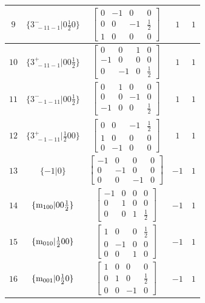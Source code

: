 \documentclass[fleqn,8pt]{jsarticle}
\begin{document}
\begin{longtable}{ccccc}
$ 9 $ & $ \{3^{-}_{\,\,-11-1}|0 \frac{1}{2} 0\} $ & $ \begin{bmatrix} 0 & -1 & 0 & 0 \\ 0 & 0 & -1 & \frac{1}{2} \\ 1 & 0 & 0 & 0 \end{bmatrix} $ & $ 1 $ & $ 1 $ \\ \hline
$ 10 $ & $ \{3^{+}_{\,\,-11-1}|0 0 \frac{1}{2}\} $ & $ \begin{bmatrix} 0 & 0 & 1 & 0 \\ -1 & 0 & 0 & 0 \\ 0 & -1 & 0 & \frac{1}{2} \end{bmatrix} $ & $ 1 $ & $ 1 $ \\ \hline
$ 11 $ & $ \{3^{-}_{\,\,-1-11}|0 0 \frac{1}{2}\} $ & $ \begin{bmatrix} 0 & 1 & 0 & 0 \\ 0 & 0 & -1 & 0 \\ -1 & 0 & 0 & \frac{1}{2} \end{bmatrix} $ & $ 1 $ & $ 1 $ \\ \hline
$ 12 $ & $ \{3^{+}_{\,\,-1-11}|\frac{1}{2} 0 0\} $ & $ \begin{bmatrix} 0 & 0 & -1 & \frac{1}{2} \\ 1 & 0 & 0 & 0 \\ 0 & -1 & 0 & 0 \end{bmatrix} $ & $ 1 $ & $ 1 $ \\ \hline
$ 13 $ & $ \{-1|0\} $ & $ \begin{bmatrix} -1 & 0 & 0 & 0 \\ 0 & -1 & 0 & 0 \\ 0 & 0 & -1 & 0 \end{bmatrix} $ & $ -1 $ & $ 1 $ \\ \hline
$ 14 $ & $ \{{\rm m}_{100}|0 0 \frac{1}{2}\} $ & $ \begin{bmatrix} -1 & 0 & 0 & 0 \\ 0 & 1 & 0 & 0 \\ 0 & 0 & 1 & \frac{1}{2} \end{bmatrix} $ & $ -1 $ & $ 1 $ \\ \hline
$ 15 $ & $ \{{\rm m}_{010}|\frac{1}{2} 0 0\} $ & $ \begin{bmatrix} 1 & 0 & 0 & \frac{1}{2} \\ 0 & -1 & 0 & 0 \\ 0 & 0 & 1 & 0 \end{bmatrix} $ & $ -1 $ & $ 1 $ \\ \hline
$ 16 $ & $ \{{\rm m}_{001}|0 \frac{1}{2} 0\} $ & $ \begin{bmatrix} 1 & 0 & 0 & 0 \\ 0 & 1 & 0 & \frac{1}{2} \\ 0 & 0 & -1 & 0 \end{bmatrix} $ & $ -1 $ & $ 1 $ \\ \hline

\end{longtable}
\end{document}
